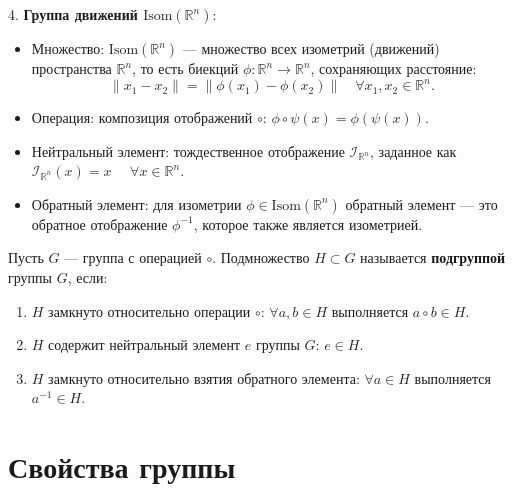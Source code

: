 \begin{shex}
4. \textbf{Группа движений \( \text{Isom}(\mathbb{R}^n) \)}:
    \begin{itemize}
       \item Множество: \( \text{Isom}(\mathbb{R}^n) \) — множество всех изометрий (движений) пространства \( \mathbb{R}^n \), то есть биекций \( \phi: \mathbb{R}^n \to \mathbb{R}^n \), сохраняющих расстояние:
       \[
       \|x_1 - x_2\| = \|\phi(x_1) - \phi(x_2)\| \quad \forall x_1, x_2 \in \mathbb{R}^n.
       \]
       \item Операция: композиция отображений \( \circ \): \( \phi \circ \psi(x) = \phi(\psi(x)) \).
       \item Нейтральный элемент: тождественное отображение \( \mathcal{I}_{\mathbb{R}^n} \), заданное как \( \mathcal{I}_{\mathbb{R}^n}(x) = x \) \(\quad \forall x \in \mathbb{R}^n \).
       \item Обратный элемент: для изометрии \( \phi \in \text{Isom}(\mathbb{R}^n) \) обратный элемент — это обратное отображение \( \phi^{-1} \), которое также является изометрией.
    \end{itemize}
\end{shex}

\clearpage


\begin{shdef}
    \begin{definition} [Подгруппа]
    \leavevmode \nl

    Пусть \( G \) — группа с операцией \( \circ \). Подмножество \( H \subset G \) называется \textbf{подгруппой} группы \( G \), если:
    \begin{enumerate}
        \item \( H \) замкнуто относительно операции \( \circ \): \(\forall a, b \in H \) выполняется \( a \circ b \in H \).
        \item \( H \) содержит нейтральный элемент \( e \) группы \( G \): \( e \in H \).
        \item \( H \) замкнуто относительно взятия обратного элемента: \(\forall a \in H \) выполняется \( a^{-1} \in H \).
    \end{enumerate}
    \end{definition}
\end{shdef}

\section{Свойства группы}

